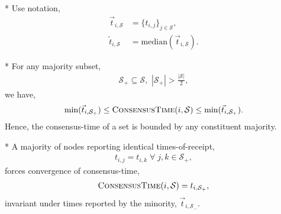 * Use notation,
\begin{align}
	\vec{t}_{i,\mathcal{S}}   & = \{t_{i,j}\}_{j\in\mathcal{S}},\nonumber   \\
	\tilde{t}_{i,\mathcal{S}} & = \mathrm{median}(\vec{t}_{i,\mathcal{S}}).
\end{align}

* For any majority subset,
\begin{align}
	\mathcal{S}_+\subseteq\mathcal{S},\,\,|\mathcal{S}_+|>\frac{|\mathcal{S}|}{2},
\end{align}
we have,
\begin{align}
	\mathrm{min}(\vec{t}_{i,\mathcal{S}_+}) \leq \textsc{ConsensusTime}(i,\mathcal{S}) \leq \mathrm{min}(\vec{t}_{i,\mathcal{S}_+}).
\end{align}
Hence, the consensus-time of a set is bounded by any constituent majority.

* A majority of nodes reporting identical times-of-receipt,
\begin{align}
	t_{i,j}=t_{i,k} \;\forall\; j,k\in\mathcal{S}_+,
\end{align}
forces convergence of consensus-time,
\begin{align} \label{eq:ct_converge}
	\textsc{ConsensusTime}(i,\mathcal{S}) = t_{i,\mathcal{S}_+},
\end{align}
invariant under times reported by the minority, $\vec{t}_{i,\mathcal{S}_-}$.

